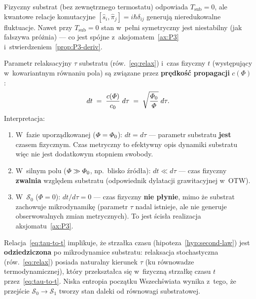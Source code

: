 \begin{remark}
Fizyczny substrat (bez zewn\k{e}trznego termostatu)
odpowiada $T_{\mathrm{sub}} = 0$, ale kwantowe
relacje komutacyjne
$[\hat{s}_i, \hat{\pi}_j] = i\hbar\delta_{ij}$
generuj\k{a} nieredukowalne fluktuacje. Nawet przy
$T_{\mathrm{sub}} = 0$ stan w~pe\l{}ni symetryczny
jest niestabilny (jak fa\l{}szywa pr\'o\.znia) ---
co jest sp\'ojne z~aksjomatem~\ref{ax:P3}
i~stwierdzeniem~\ref{prop:P3-deriv}.
\end{remark}

\begin{proposition}%
\label{prop:tau-to-t}
Parametr relaksacyjny $\tau$ substratu (r\'ow.~\ref{eq:relax})
i~czas fizyczny $t$ (wyst\k{e}puj\k{a}cy w~kowariantnym r\'ownaniu
pola) s\k{a} zwi\k{a}zane przez
\textbf{pr\k{e}dko\'s\'c propagacji} $c(\Phi)$:
\begin{equation}\label{eq:tau-to-t}
  dt \;=\; \frac{c(\varPhi)}{c_0}\;d\tau
  \;=\; \sqrt{\frac{\varPhi_0}{\varPhi}}\;d\tau.
\end{equation}
Interpretacja:
\begin{enumerate}[nosep]
  \item W~fazie uporz\k{a}dkowanej ($\varPhi = \varPhi_0$):
    $dt = d\tau$ --- parametr substratu \textbf{jest} czasem
    fizycznym. Czas metryczny to efektywny opis dynamiki
    substratu wi\k{e}c nie jest dodatkowym stopniem swobody.
  \item W~silnym polu ($\varPhi \gg \varPhi_0$, np.\ blisko
    \'zr\'od\l{}a): $dt \ll d\tau$ --- czas fizyczny
    \textbf{zwalnia} wzgl\k{e}dem substratu (odpowiednik
    dylatacji grawitacyjnej w~OTW).
  \item W~$\mathcal{S}_0$ ($\Phi = 0$): $dt/d\tau = 0$ ---
    czas fizyczny \textbf{nie p\l{}ynie}, mimo \.ze substrat
    zachowuje mikrodynamik\k{e} (parametr $\tau$ nadal
    istnieje, ale nie generuje obserwowalnych zmian
    metrycznych). To jest \'scis\l{}a realizacja
    aksjomatu~\ref{ax:P3}.
\end{enumerate}
\end{proposition}

\begin{remark}%
\label{rem:arrow-from-substrate}
Relacja~\eqref{eq:tau-to-t} implikuje, \.ze strza\l{}ka czasu
(hipoteza~\ref{hyp:second-law}) jest \textbf{odziedziczona}
po mikrodynamice substratu: relaksacja stochastyczna
(r\'ow.~\ref{eq:relax}) posiada naturalny kierunek
$\tau$ (ku r\'ownowadze termodynamicznej), kt\'ory
przekszta\l{}ca si\k{e} w~fizyczn\k{a} strza\l{}k\k{e}
czasu $t$ przez~\eqref{eq:tau-to-t}. Niska entropia
pocz\k{a}tku Wszech\'swiata wynika z~tego, \.ze
przej\'scie $\mathcal{S}_0 \to \mathcal{S}_1$
tworzy stan daleki od r\'ownowagi substratowej.
\end{remark}

